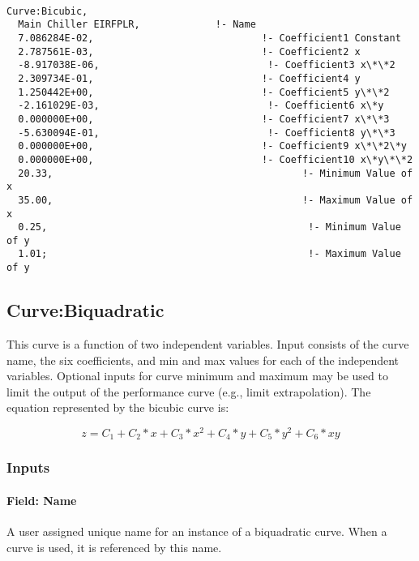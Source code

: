 \begin{lstlisting}

Curve:Bicubic,
  Main Chiller EIRFPLR,             !- Name
  7.086284E-02,                             !- Coefficient1 Constant
  2.787561E-03,                             !- Coefficient2 x
  -8.917038E-06,                             !- Coefficient3 x\*\*2
  2.309734E-01,                             !- Coefficient4 y
  1.250442E+00,                             !- Coefficient5 y\*\*2
  -2.161029E-03,                             !- Coefficient6 x\*y
  0.000000E+00,                             !- Coefficient7 x\*\*3
  -5.630094E-01,                             !- Coefficient8 y\*\*3
  0.000000E+00,                             !- Coefficient9 x\*\*2\*y
  0.000000E+00,                             !- Coefficient10 x\*y\*\*2
  20.33,                                           !- Minimum Value of x
  35.00,                                           !- Maximum Value of x
  0.25,                                             !- Minimum Value of y
  1.01;                                             !- Maximum Value of y
\end{lstlisting}

\subsection{Curve:Biquadratic}\label{curvebiquadratic}

This curve is a function of two independent variables. Input consists of the curve name, the six coefficients, and min and max values for each of the independent variables. Optional inputs for curve minimum and maximum may be used to limit the output of the performance curve (e.g., limit extrapolation). The equation represented by the bicubic curve is:

\begin{equation}
z = {C_1} + {C_2}*x + {C_3}*{x^2} + {C_4}*y + {C_5}*{y^2} + {C_6}*xy
\end{equation}

\subsubsection{Inputs}\label{inputs-7-016}

\paragraph{Field: Name}\label{field-name-7-012}

A user assigned unique name for an instance of a biquadratic curve. When a curve is used, it is referenced by this name.

